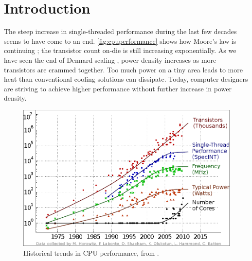 \chapter{Introduction}

The steep increase in single-threaded performance during the last few decades
seems to have come to an end. \autoref{fig:cpuperformance} shows how Moore's law
is continuing \cite{moore1965cramming, tanenbaum1984structured}; the transistor
count on-die is still increasing exponentially. As we have seen the end of
Dennard scaling \cite{dennard1974design,esmaeilzadeh2011dark}, power density
increases as more transistors are crammed together. Too much power on a tiny area
leads to more heat than conventional cooling solutions can dissipate. Today,
computer designers are striving to achieve higher performance without further
increase in power density.


\begin{figure}[bht]
\includegraphics[width=\textwidth]{figs/cpu-performance.png}
\caption{Historical trends in CPU performance, from \cite{salishan2011}.}
    \label{fig:cpuperformance}
\end{figure}











%


